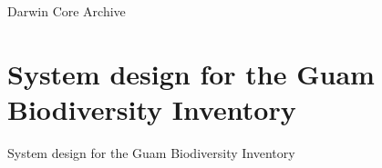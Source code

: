 \documentclass[]{beamer}
\begin{document}
\begin{frame}{Darwin Core Archive}
\end{frame}


\section{System design for the Guam Biodiversity Inventory}

\begin{frame}{System design for the Guam Biodiversity Inventory}
\end{frame}
\end{document}
